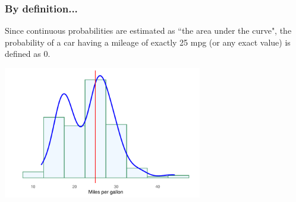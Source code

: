 \documentclass[notes,11pt, aspectratio=169]{beamer}
\begin{document}

\begin{frame}
\frametitle{By definition...}

Since continuous probabilities are estimated as ``the area under the curve", the probability of a car having a mileage of exactly 25 mpg (or any exact value) is defined as 0.

\begin{center}
\includegraphics[width=0.65\textwidth]{graphs/l03f06}
\end{center}

\end{frame}

\end{document}
